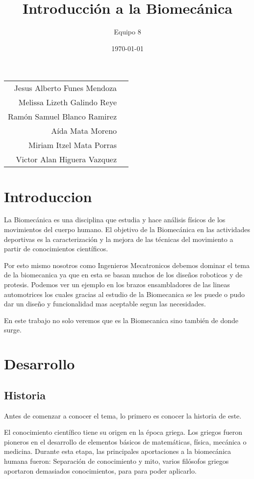 \documentclass{article}
\title{Introducción a la Biomecánica}
\date{\today}
\author{Equipo 8}
\begin{document}
\maketitle
\flushleft

\begin{tabular}{r l}
Jesus Alberto Funes Mendoza  \\
Melissa Lizeth Galindo Reye  \\
Ramón Samuel Blanco Ramirez  \\
Aída Mata Moreno  \\
Miriam Itzel Mata Porras  \\
Victor Alan Higuera Vazquez \\


\end{tabular}

\section{Introduccion}

La Biomecánica es una disciplina que estudia y hace análisis físicos de los movimientos del cuerpo humano. El objetivo de la Biomecánica en las actividades deportivas es la caracterización y la mejora de las técnicas del movimiento a partir de conocimientos científicos. \cite{ff2}

Por esto mismo nosotros como Ingenieros Mecatronicos debemos dominar el tema de la biomecanica ya que en esta se basan muchos de los diseños roboticos y de protesis. Podemos ver un ejemplo en los brazos ensambladores de las lineas automotrices los cuales gracias al estudio de la Biomecanica se les puede o pudo dar un diseño y funcionalidad mas aceptable segun las necesidades.

En este trabajo no solo veremos que es la Biomecanica sino también de donde surge.


\section{Desarrollo}

\subsection{Historia}

Antes de comenzar a conocer el tema, lo primero es conocer la historia de este.

El conocimiento científico tiene su origen en la época griega. Los griegos fueron pioneros en el desarrollo de elementos básicos de matemáticas, física, mecánica o medicina. Durante esta etapa, las principales aportaciones a la biomecánica humana fueron: Separación de conocimiento y mito, varios filósofos griegos aportaron demasiados conocimientos, para para poder aplicarlo. \cite{ff3}
\end{document}
